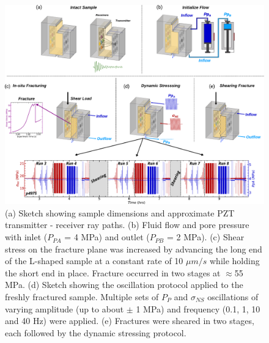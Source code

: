 \documentclass[letterpaper,10pt]{article}
\begin{document}
\newpage


\begin{figure}[ht]
	\centering
	\includegraphics[width=0.99\columnwidth]{exp_sequence_v3}
	\caption[]{(a) Sketch showing sample dimensions and approximate PZT transmitter - receiver ray paths.
		(b) Fluid flow and pore pressure with inlet ($P_{PA}$ = 4 MPa) and outlet ($P_{PB}$ = 2 MPa).
		(c) Shear stress on the fracture plane was increased by advancing the long end of the L-shaped sample at a constant rate of 10 $\mu m/s$ while holding the short end in place. Fracture occurred in two stages at $ \approx $55 MPa.
		(d) Sketch showing the oscillation protocol applied to the freshly fractured sample. Multiple sets of $P_{P}$ and $ \sigma_{NS} $ oscillations of varying amplitude (up to about $ \pm $ 1 MPa) and frequency (0.1, 1, 10 and 40 Hz) were applied.
		(e) Fractures were sheared in two stages, each followed by the dynamic stressing protocol.}
	\label{fig:exp_seq}
\end{figure}


\newpage

\end{document}
